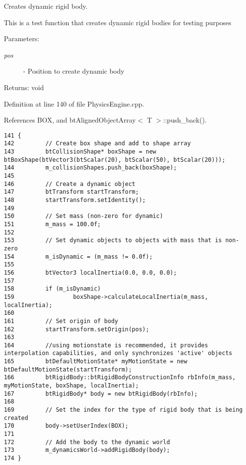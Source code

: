 Creates dynamic rigid body. 

This is a test function that creates dynamic rigid bodies for testing purposes

\begin{Desc}
\item[Parameters:]
\begin{description}
\item[{\em pos}]- Position to create dynamic body\end{description}
\end{Desc}
\begin{Desc}
\item[Returns:]void \end{Desc}


Definition at line 140 of file PhysicsEngine.cpp.

References BOX, and btAlignedObjectArray$<$ T $>$::push\_\-back().

\begin{Code}\begin{verbatim}141 {
142         // Create box shape and add to shape array
143         btCollisionShape* boxShape = new btBoxShape(btVector3(btScalar(20), btScalar(50), btScalar(20)));
144         m_collisionShapes.push_back(boxShape);
145 
146         // Create a dynamic object
147         btTransform startTransform;
148         startTransform.setIdentity();
149 
150         // Set mass (non-zero for dynamic)
151         m_mass = 100.0f;
152 
153         // Set dynamic objects to objects with mass that is non-zero
154         m_isDynamic = (m_mass != 0.0f);
155 
156         btVector3 localInertia(0.0, 0.0, 0.0);
157 
158         if (m_isDynamic)
159                 boxShape->calculateLocalInertia(m_mass, localInertia);
160 
161         // Set origin of body
162         startTransform.setOrigin(pos);
163 
164         //using motionstate is recommended, it provides interpolation capabilities, and only synchronizes 'active' objects
165         btDefaultMotionState* myMotionState = new btDefaultMotionState(startTransform);
166         btRigidBody::btRigidBodyConstructionInfo rbInfo(m_mass, myMotionState, boxShape, localInertia);
167         btRigidBody* body = new btRigidBody(rbInfo);
168 
169         // Set the index for the type of rigid body that is being created
170         body->setUserIndex(BOX);
171         
172         // Add the body to the dynamic world
173         m_dynamicsWorld->addRigidBody(body);
174 }
\end{verbatim}
\end{Code}




